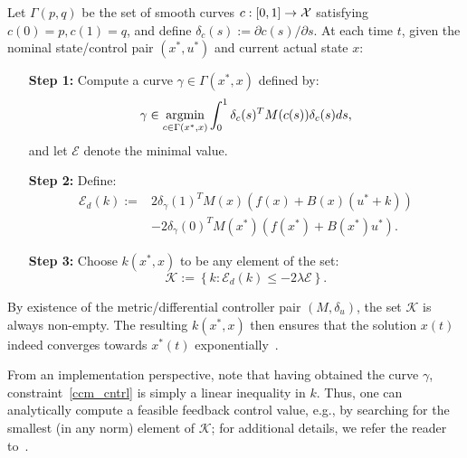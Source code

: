 Let $\Gamma(p,q)$ be the set of smooth curves $c:[0,1] \rightarrow \mathcal{X}$ satisfying $c(0) = p, c(1) = q$, and define $\delta_c(s) := \partial c(s)/\partial s$. At each time $t$, given the nominal state/control pair $(x^*,u^*)$ and current actual state $x$:
\begin{leftbox}
\begin{itemize}[leftmargin=.4in]
    \item[{\bf Step 1:}] Compute a curve $\gamma \in \Gamma(x^*,x)$ defined by:
\begin{equation}
    \gamma \in \argmin_{c\in \Gamma(x^*, x)} \int_{0}^{1} \delta_c(s)^T M(c(s)) \delta_c (s) ds,
\end{equation}
    and let $\mathcal{E}$ denote the minimal value.
    \item[{\bf Step 2:}] Define: 
    \begin{equation}
    \begin{split}
        \mathcal{E}_d(k):= &2 \delta_{\gamma}(1)^T M(x) (f(x) + B(x) (u^* + k)) \\
        &- 2\delta_{\gamma}(0)^T M(x^*) (f(x^*) + B(x^*)u^*).
    \end{split}
    \label{ccm_ineq}
    \end{equation}
    \item[{\bf Step 3:}] Choose $k(x^*,x)$ to be any element of the set:
    \begin{equation}
        \mathcal{K} := \left\{ k : \mathcal{E}_d(k) \leq -2\lambda \mathcal{E} \right\}.
    \label{ccm_cntrl}
    \end{equation}
\end{itemize}
\end{leftbox}


By existence of the metric/differential controller pair $(M,\delta_u)$, the set $\mathcal{K}$ is always non-empty. The resulting $k(x^*,x)$ then ensures that the solution $x(t)$ indeed converges towards $x^*(t)$ exponentially~\cite{SinghMajumdarEtAl2017}.

From an implementation perspective, note that having obtained the curve $\gamma$, constraint~\eqref{ccm_cntrl} is simply a linear inequality in $k$. Thus, one can analytically compute a feasible feedback control value, e.g., by searching for the smallest (in any norm) element of $\mathcal{K}$; for additional details, we refer the reader to~\cite{ManchesterSlotine2017,SinghMajumdarEtAl2017}.